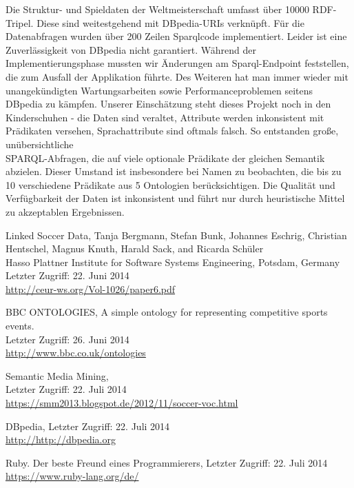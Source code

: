 \documentclass[runningheads,a4paper]{llncs}
\begin{document}
Die Struktur- und Spieldaten der Weltmeisterschaft umfasst über 10000 RDF-Tripel. Diese sind weitestgehend mit DBpedia-URIs verknüpft. Für die Datenabfragen wurden über 200 Zeilen Sparqlcode implementiert. Leider ist eine Zuverlässigkeit von DBpedia nicht garantiert. Während der Implementierungsphase mussten wir Änderungen am Sparql-Endpoint feststellen, die zum Ausfall der Applikation führte. Des Weiteren hat man immer wieder mit unangekündigten Wartungsarbeiten sowie Performanceproblemen seitens DBpedia zu kämpfen. Unserer Einschätzung steht dieses Projekt noch in den Kinderschuhen - die Daten sind veraltet, Attribute werden inkonsistent mit Prädikaten versehen, Sprachattribute sind oftmals falsch. So entstanden große, unübersichtliche\\ SPARQL-Abfragen, die auf viele optionale Prädikate der gleichen Semantik abzielen. Dieser Umstand ist insbesondere bei Namen zu beobachten, die bis zu 10 verschiedene Prädikate aus 5 Ontologien berücksichtigen. Die Qualität und Verfügbarkeit der Daten ist inkonsistent und führt nur durch heuristische Mittel zu akzeptablen Ergebnissen.



\begin{thebibliography}{4}

Linked Soccer Data,
Tanja Bergmann, Stefan Bunk, Johannes Eschrig, Christian Hentschel, Magnus Knuth, Harald Sack, and Ricarda Schüler\\
Hasso Plattner Institute for Software Systems Engineering, Potsdam, Germany\\
Letzter Zugriff: 22. Juni 2014\\
\url{http://ceur-ws.org/Vol-1026/paper6.pdf}

BBC ONTOLOGIES, A simple ontology for representing competitive sports events.\\
Letzter Zugriff: 26. Juni 2014\\
\url{http://www.bbc.co.uk/ontologies}

Semantic Media Mining,\\
Letzter Zugriff: 22. Juli 2014\\
\url{https://smm2013.blogspot.de/2012/11/soccer-voc.html}

DBpedia,
Letzter Zugriff: 22. Juli 2014\\
\url{http://http://dbpedia.org}

Ruby. Der beste Freund eines Programmierers,
Letzter Zugriff: 22. Juli 2014\\
\url{https://www.ruby-lang.org/de/}

\end{thebibliography}
\end{document}

